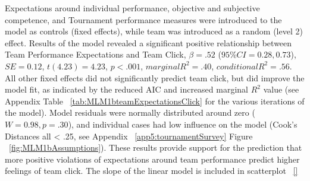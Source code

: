 \begin{landscape}
Expectations around individual performance, objective and subjective competence, and Tournament performance measures were introduced to the model as controls (fixed effects), while team was introduced as a random (level 2) effect.  Results of the model revealed a significant positive relationship between Team Performance Expectations and Team Click, $\beta = .52$ ($95\% CI =  0.28, 0.73$), $SE = 0.12$, $t(4.23) = 4.23$, $p < .001$, $marginal R^2 = .40$, $conditional R^2 = .56$.  All other fixed effects did not significantly predict team click, but did improve the model fit, as indicated by the reduced AIC and increased marginal $R^2$ value (see Appendix Table ~\ref{tab:MLM1bteamExpectationsClick} for the various iterations of the model).   Model residuals were normally distributed around zero ($W = 0.98, p = .30$), and individual cases had low influence on the model (Cook's Distances all < .25, see Appendix ~\ref{app5:tournamentSurvey} Figure ~\ref{fig:MLM1bAssumptions}).  These results provide support for the prediction that more positive violations of expectations around team performance predict higher feelings of team click.  The slope of the linear model is included in scatterplot ~\ref{}


  


\end{landscape}
